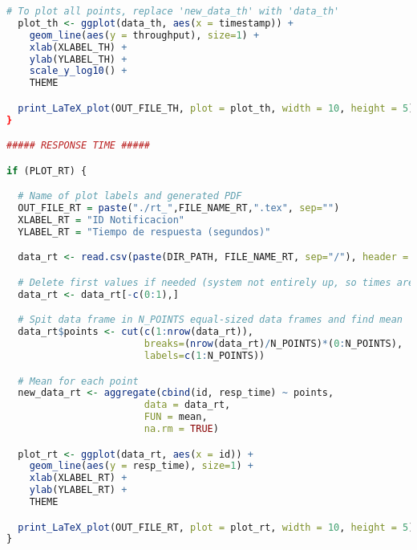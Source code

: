 \begin{lstlisting}[language=R, caption={Programa en R para generar las gráficas del Throughput y del Tiempo de Respuesta.}]
  # To plot all points, replace 'new_data_th' with 'data_th'
  plot_th <- ggplot(data_th, aes(x = timestamp)) +
    geom_line(aes(y = throughput), size=1) +
    xlab(XLABEL_TH) +
    ylab(YLABEL_TH) +
    scale_y_log10() +
    THEME

  print_LaTeX_plot(OUT_FILE_TH, plot = plot_th, width = 10, height = 5)
}

##### RESPONSE TIME #####

if (PLOT_RT) {

  # Name of plot labels and generated PDF
  OUT_FILE_RT = paste("./rt_",FILE_NAME_RT,".tex", sep="")
  XLABEL_RT = "ID Notificacion"
  YLABEL_RT = "Tiempo de respuesta (segundos)"

  data_rt <- read.csv(paste(DIR_PATH, FILE_NAME_RT, sep="/"), header = TRUE, sep = ",")

  # Delete first values if needed (system not entirely up, so times are very high)
  data_rt <- data_rt[-c(0:1),]

  # Spit data frame in N_POINTS equal-sized data frames and find mean
  data_rt$points <- cut(c(1:nrow(data_rt)),
                        breaks=(nrow(data_rt)/N_POINTS)*(0:N_POINTS),
                        labels=c(1:N_POINTS))

  # Mean for each point
  new_data_rt <- aggregate(cbind(id, resp_time) ~ points,
                        data = data_rt,
                        FUN = mean,
                        na.rm = TRUE)

  plot_rt <- ggplot(data_rt, aes(x = id)) +
    geom_line(aes(y = resp_time), size=1) +
    xlab(XLABEL_RT) +
    ylab(YLABEL_RT) +
    THEME

  print_LaTeX_plot(OUT_FILE_RT, plot = plot_rt, width = 10, height = 5)
}

\end{lstlisting}

